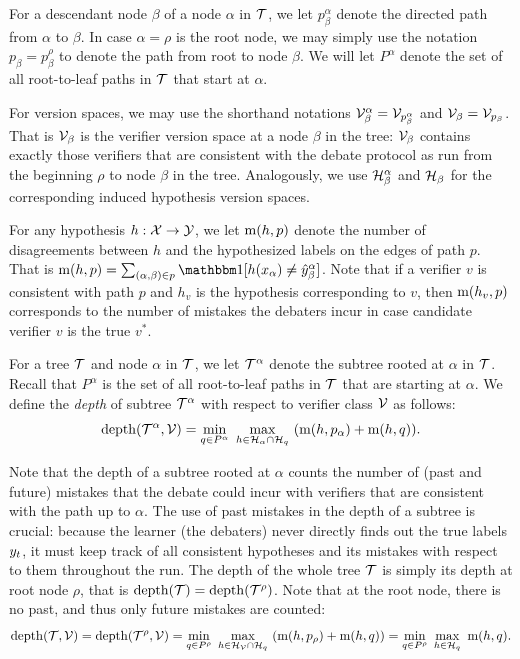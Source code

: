 \documentclass[11pt,letterpaper]{article}
\theoremstyle{definition}
\theoremstyle{plain}
\begin{document}
For a descendant node $\beta$ of a node $\alpha$ in ${\mathcal T}$, we let $p^\alpha_\beta$ denote the directed path from $\alpha$ to $\beta$.  In case $\alpha =\rho$ is the root node, we may simply use the notation $p_\beta = p^\rho_\beta$ to denote the path from root to node $\beta$. We will let $P^\alpha$ denote the set of all root-to-leaf paths in ${\mathcal T}$ that start at $\alpha$.

For version spaces, we may use the shorthand notations ${\mathcal V}^\alpha_\beta = {\mathcal V}_{p^\alpha_\beta}$ and ${\mathcal V}_\beta = {\mathcal V}_{p_\beta}$. That is ${\mathcal V}_\beta$ is the verifier version space at a node $\beta$ in the tree: ${\mathcal V}_\beta$ contains exactly those verifiers that are consistent with the debate protocol as run from the beginning $\rho$ to node $\beta$ in the tree. Analogously, we use ${{\mathcal H}}^\alpha_\beta$ and ${{\mathcal H}}_\beta$ for the corresponding induced hypothesis version spaces.

For any hypothesis $h:{\mathcal X}\to{\mathcal Y}$, we let $\mathrm{m}(h, p )$ denote the number of disagreements between $h$ and the hypothesized labels on the edges of path $p$. That is $\mi(h, p) = \sum_{(\alpha, \beta)\in p}\indct[h(x_\alpha)\neq \hy^\alpha_\beta]$.
Note that if a verifier $v$ is consistent with path $p$ and $h_v$ is the hypothesis corresponding to $v$, then  $\mathrm{m}(h_v, p)$ corresponds to the number of mistakes the debaters incur in case candidate verifier $v$ is the true $v^*$.


For a tree ${\mathcal T}$ and node $\alpha$ in ${\mathcal T}$, we let ${\mathcal T}^\alpha$ denote the subtree rooted at $\alpha$ in ${\mathcal T}$. Recall that $P^\alpha$ is the set of all root-to-leaf paths in ${\mathcal T}$ that are starting at $\alpha$.
We define the \emph{depth} of subtree ${\mathcal T}^\alpha$ with respect to verifier class ${\mathcal V}$ as follows:
\[
\mathrm{depth}({\mathcal T}^\alpha, {\mathcal V}) = \min_{q\in P^\alpha}~ \max_{h\in {{\mathcal H}}_\alpha \cap {{\mathcal H}}_q}~  ( \mathrm{m}(h, p_\alpha) + \mathrm{m}(h, q) ).
\]

Note that the depth of a subtree rooted at $\alpha$ counts the number of (past and future) mistakes that the debate could incur with verifiers that are consistent with the path up to $\alpha$.
The use of past mistakes in the depth of a subtree is crucial: because the learner (the debaters) never directly finds out the true  labels $y_t$, it must keep track of all consistent hypotheses and its mistakes with respect to them throughout the run.
The depth of the whole tree ${\mathcal T}$ is simply its depth at root node $\rho$, that is $\mathrm{depth}({\mathcal T}) = \mathrm{depth}({\mathcal T}^\rho)$. Note that at the root node, there is no past, and thus only future mistakes are counted:
\[
\mathrm{depth}({\mathcal T},{\mathcal V}) = \mathrm{depth}({\mathcal T}^\rho,{\mathcal V}) = \min_{q\in P^\rho}~ \max_{h\in {{\mathcal H}}_{\mathcal V} \cap {{\mathcal H}}_q}~  ( \mathrm{m}(h, p_\rho) + \mathrm{m}(h, q) )  = \min_{q\in P^\rho}~ \max_{h\in {{\mathcal H}}_{q}}~    \mathrm{m}(h, q).
\]
\end{document}
